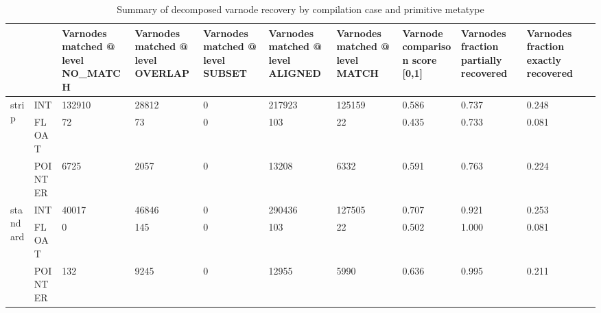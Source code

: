 \begin{table*}[t]
\centering
\caption{Summary of decomposed varnode recovery by compilation case and primitive metatype}
\label{table*:opts-varnodes-summary-metatypes-decomposed}
\begin{tabular}{lp{1.2cm}p{1.2cm}p{1.2cm}p{1.2cm}p{1.2cm}p{1.2cm}p{1.2cm}p{1.2cm}p{1.2cm}p{1.2cm}}
\toprule
      &         &  Varnodes matched @ level NO\_MATCH &  Varnodes matched @ level OVERLAP &  Varnodes matched @ level SUBSET &  Varnodes matched @ level ALIGNED &  Varnodes matched @ level MATCH &  Varnode comparison score [0,1] &  Varnodes fraction partially recovered &  Varnodes fraction exactly recovered \\
\midrule
\multirow{3}{*}{strip} & INT &                             132910 &                             28812 &                                0 &                            217923 &                          125159 &                           0.586 &                                  0.737 &                                0.248 \\
      & FLOAT &                                 72 &                                73 &                                0 &                               103 &                              22 &                           0.435 &                                  0.733 &                                0.081 \\
      & POINTER &                               6725 &                              2057 &                                0 &                             13208 &                            6332 &                           0.591 &                                  0.763 &                                0.224 \\
\cline{1-10}
\multirow{3}{*}{standard} & INT &                              40017 &                             46846 &                                0 &                            290436 &                          127505 &                           0.707 &                                  0.921 &                                0.253 \\
      & FLOAT &                                  0 &                               145 &                                0 &                               103 &                              22 &                           0.502 &                                  1.000 &                                0.081 \\
      & POINTER &                                132 &                              9245 &                                0 &                             12955 &                            5990 &                           0.636 &                                  0.995 &                                0.211 \\

\end{tabular}
\end{table*}
